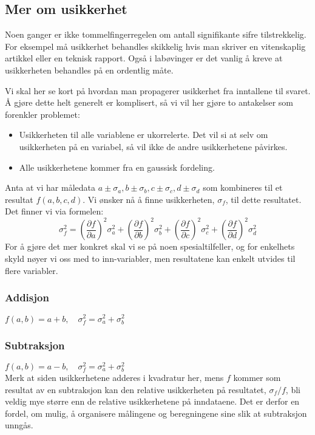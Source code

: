 \documentclass[a4paper,norsk,12pt]{book}
\begin{document}
\subsection{Mer om usikkerhet}
Noen ganger er ikke tommelfingerregelen om antall signifikante sifre tilstrekkelig. For eksempel må usikkerhet behandles skikkelig hvis man skriver en vitenskaplig artikkel eller en teknisk rapport. Også i labøvinger er det vanlig å kreve at usikkerheten behandles på en ordentlig måte. 

Vi skal her se kort på hvordan man propagerer usikkerhet fra inntallene til svaret. Å gjøre dette helt generelt er komplisert, så vi vil her gjøre to antakelser som forenkler problemet:
\begin{itemize}
\item
Usikkerheten til alle variablene er ukorrelerte. Det vil si at selv om usikkerheten på en variabel, så vil ikke de andre 	usikkerhetene påvirkes.
\item
Alle usikkerhetene kommer fra en gaussisk fordeling. 
\end{itemize}
Anta at vi har måledata $a\pm\sigma_a,b\pm\sigma_b,c\pm\sigma_c,d\pm\sigma_d$ som kombineres til et resultat $f(a,b,c,d)$. Vi ønsker nå å finne usikkerheten, $\sigma_f$, til dette resultatet. Det finner vi via formelen:
\begin{displaymath}
	\sigma_f^2 =
	\left(\frac{\partial f}{\partial a}\right)^2\sigma_a^2 + \left(\frac{\partial f}{\partial b}\right)^2\sigma_b^2 + 
	\left(\frac{\partial f}{\partial c}\right)^2\sigma_c^2 + \left(\frac{\partial f}{\partial d}\right)^2\sigma_d^2 
\end{displaymath}
For å gjøre det mer konkret skal vi se på noen spesialtilfeller, og for enkelhets skyld nøyer vi oss med to inn-variabler, men resultatene kan enkelt utvides til flere variabler.
\subsubsection*{Addisjon}
$f(a,b) = a + b,\quad	\sigma_f^2 = \sigma_a^2 + \sigma_b^2$
\subsubsection*{Subtraksjon}
$f(a,b) = a - b, \quad	\sigma_f^2 = \sigma_a^2 + \sigma_b^2$ \\
Merk at siden usikkerhetene adderes i kvadratur her, mens $f$ kommer som resultat av en subtraksjon kan den relative usikkerheten på resultatet, $\sigma_f/f$, bli veldig mye større enn de relative usikkerhetene på inndataene. Det er derfor en fordel, om mulig, å organisere målingene og beregningene sine slik at subtraksjon unngås.
\end{document}
